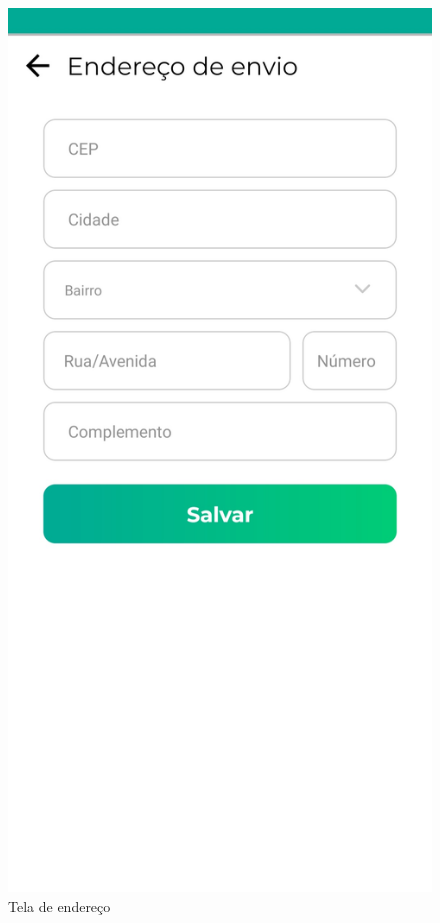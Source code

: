 \begin{figure}[h]
	\centering
	\includegraphics[keepaspectratio=true,scale=0.16]{figuras/tela_endereco.jpg}
	\caption{Tela de endereço}
        \label{tela-edereco-app}
\end{figure}

